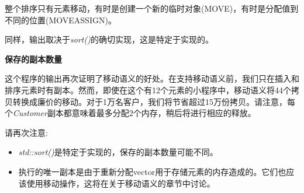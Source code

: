 整个排序只有元素移动，有时是创建一个新的临时对象(MOVE)，有时是分配值到不同的位置(MOVEASSIGN)。\par

同样，输出取决于\textit{sort()}的确切实现，这是特定于实现的。\par

\hspace*{\fill} \par %
\textbf{保存的副本数量}

这个程序的输出再次证明了移动语义的好处。在支持移动语义前，我们只在插入和排序元素时有副本。然而，即使在这个有12个元素的小程序中，移动语义将44个拷贝转换成廉价的移动。对于1万名客户，我们将节省超过15万份拷贝。请注意，每个\textit{Customer}副本都意味着最多分配2个内存，稍后将进行相应的释放。\par

请再次注意:\par

\begin{itemize}
	\item \textit{std::sort()}是特定于实现的，保存的副本数量可能不同。
	\item 执行的唯一副本是由于重新分配vector用于存储元素的内存造成的。它们也应该使用移动操作，这将在关于移动语义的章节中讨论。
\end{itemize}

























